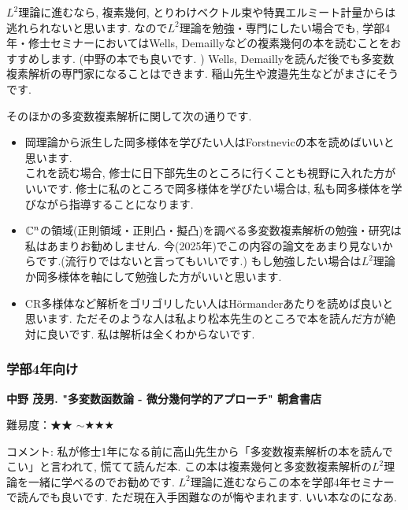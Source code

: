 $L^2$理論に進むなら, 複素幾何, とりわけベクトル束や特異エルミート計量からは逃れられないと思います. 
なので$L^2$理論を勉強・専門にしたい場合でも, 学部4年・修士セミナーにおいてはWells, Demaillyなどの複素幾何の本を読むことをおすすめします. (中野の本でも良いです. )
Wells, Demaillyを読んだ後でも多変数複素解析の専門家になることはできます. 稲山先生や渡邉先生などがまさにそうです. 

そのほかの多変数複素解析に関して次の通りです. 
\vspace{-8pt}
\begin{tcolorbox}[mybox]
\begin{itemize}[left=0pt]
  \setlength{\parskip}{0cm} %
  \setlength{\itemsep}{5pt} %
\item 岡理論から派生した岡多様体を学びたい人はForstnevicの本を読めばいいと思います.  \\ これを読む場合, 修士に日下部先生のところに行くことも視野に入れた方がいいです. 修士に私のところで岡多様体を学びたい場合は, 私も岡多様体を学びながら指導することになります. 
\item $\mathbb{C}^n$の領域(正則領域・正則凸・擬凸)を調べる多変数複素解析の勉強・研究は私はあまりお勧めしません. 今(2025年)でこの内容の論文をあまり見ないからです.(流行りではないと言ってもいいです.) もし勉強したい場合は$L^2$理論か岡多様体を軸にして勉強した方がいいと思います. 
\item CR多様体など解析をゴリゴリしたい人はH\"ormanderあたりを読めば良いと思います. ただそのような人は私より松本先生のところで本を読んだ方が絶対に良いです. 私は解析は全くわからないです. 
\end{itemize}
\end{tcolorbox}




\subsubsection{学部4年向け}

\textbf{中野 茂男. "多変数函数論 - 微分幾何学的アプローチ" 朝倉書店}  　\vspace{-6pt} 

難易度：★★ $\sim$★★★ 　\vspace{-6pt} 

コメント: 私が修士1年になる前に高山先生から「多変数複素解析の本を読んでこい」と言われて, 慌てて読んだ本. この本は複素幾何と多変数複素解析の$L^2$理論を一緒に学べるのでお勧めです. $L^2$理論に進むならこの本を学部4年セミナーで読んでも良いです. ただ現在入手困難なのが悔やまれます. いい本なのになあ. 

